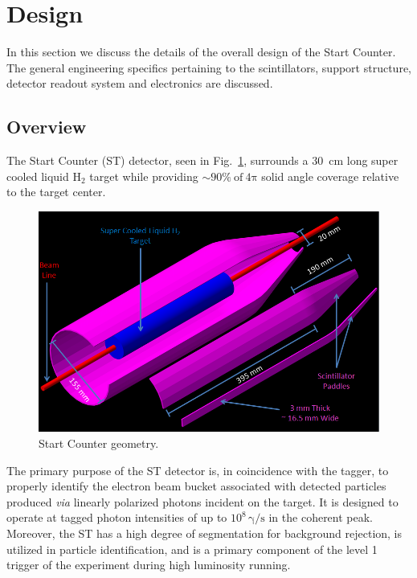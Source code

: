 \section{Design} \label{design}

In this section we discuss the details of the overall design of the \gx{} Start Counter.  The general engineering specifics pertaining to the scintillators, support structure, detector readout system and electronics are discussed.

\subsection{Overview}
The Start Counter (ST) detector, seen in Fig.~\ref{fig:st-geo}, surrounds a 30~cm long super cooled liquid $\mathrm{H_{2}}$ target while providing $\sim 90 \%\ \mathrm{of\ 4 \pi}$ solid angle coverage relative to the target center.
\begin{figure}[!htb]
	\centering
	\includegraphics[width=1.0\columnwidth]{design/figs/30_Element_Pieces_Removed}
	\caption[Start Counter geometry]{Start Counter geometry.}
	\label{fig:st-geo}
\end{figure}
The primary purpose of the ST detector is, in coincidence with the tagger, to properly identify the electron beam bucket associated with detected particles produced \textit{via} linearly polarized photons incident on the target. It is designed to operate at tagged photon intensities of up to $10^{8}\,\mathrm{\gamma/s}$ in the coherent peak.  Moreover, the ST has a high degree of segmentation for background rejection, is utilized in particle identification, and is a primary component of the level 1 trigger of the \gx{} experiment during high luminosity running\cite{pooser16}.

